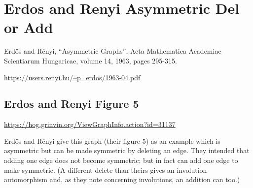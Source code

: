 \documentclass{article}
\begin{document}
\begin{center}
\end{center}


\section{Erdos and Renyi Asymmetric Del or Add}

Erd\H{o}s and R\'enyi, ``Asymmetric Graphs'', Acta Mathematica
Academiae Scientiarum Hungaricae, volume 14, 1963, pages 295-315.

\url{https://users.renyi.hu/~p_erdos/1963-04.pdf}

\subsection{Erdos and Renyi Figure 5}

\url{https://hog.grinvin.org/ViewGraphInfo.action?id=31137}

\smallskip

Erd\H{o}s and R\'enyi give this graph (their figure 5) as an example
which is asymmetric but can be made symmetric by deleting an edge.
They intended that adding one edge does not become symmetric; but in
fact can add one edge to make symmetric.  (A different delete than
theirs gives an involution automorphism and, as they note concerning
involutions, an addition can too.)
\end{document}
